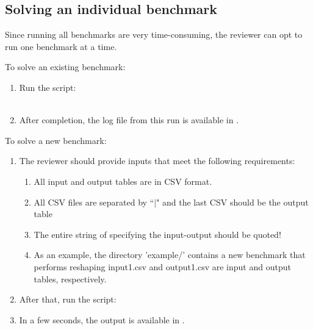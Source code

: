 \subsection{Solving an individual benchmark}

Since running all benchmarks are very time-consuming, the reviewer can opt to run one benchmark at a time.

To solve an existing benchmark:
\begin{enumerate}
\item Run the script:\\ 
\\
\item After completion, the log file from this run is available in .
\end{enumerate}

To solve a new benchmark:
\begin{enumerate}
\item The reviewer should provide inputs that meet the following requirements:
  \begin{enumerate}
  \item All input and output tables are in CSV format. 
  \item All CSV files are separated by ``$\vert$" and the last CSV should be the output table
  \item The entire string of specifying the input-output should be quoted!
  \item As an example, the directory 'example/' contains a new benchmark that performs reshaping input1.csv and output1.csv are input and output tables, respectively. 
  \end{enumerate}

\item After that, run the script:\\
\item In a few seconds, the output is available in .
\end{enumerate}


